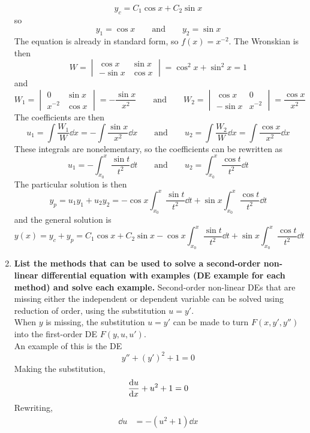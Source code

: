 \documentclass[12pt]{article}
\begin{document}
\begin{enumerate}
				\[y_c = C_1\cos x + C_2\sin x\]
				so
				\[
					y_1 = \cos x \qquad \text{and} \qquad
					y_2 = \sin x
				\]
				The equation is already in standard form, so \(f(x) = x^{-2}\).	The Wronskian is then
				\[
					W = \begin{vmatrix}
						\cos x & \sin x \\
						-\sin x & \cos x
					\end{vmatrix} = \cos^2x + \sin^2x = 1
				\]
				and
				\[
					W_1 = \begin{vmatrix}
						0 & \sin x \\
						x^{-2} & \cos x
					\end{vmatrix} = -\frac{\sin x}{x^2} \qquad \text{and} \qquad
					W_2 = \begin{vmatrix}
 						\cos x & 0 \\
 						-\sin x & x^{-2}
 					\end{vmatrix} = \frac{\cos x}{x^2}
				\]
				The coefficients are then
				\[
					u_1 = \int \frac{W_1}{W} \dd{x} = -\int \frac{\sin x}{x^2} \dd{x} \qquad \text{and} \qquad
					u_2 = \int \frac{W_2}{W} \dd{x} = \int \frac{\cos x}{x^2} \dd{x}
				\]
				These integrals are nonelementary, so the coefficients can be rewritten as
				\[
					u_1 = -\int_{x_0}^x \frac{\sin t}{t^2} \dd{t} \qquad \text{and} \qquad
					u_2 = \int_{x_0}^x \frac{\cos t}{t^2}\dd{t}
				\]
				The particular solution is then
				\[
					y_p = u_1y_1 + u_2y_2
						= -\cos x\int_{x_0}^x \frac{\sin t}{t^2}\dd{t} + \sin x\int_{x_0}^x \frac{\cos t}{t^2}\dd{t}
				\]
				and the general solution is
				\[
					y(x) = y_c + y_p 
						= C_1\cos x + C_2\sin x -\cos x\int_{x_0}^x \frac{\sin t}{t^2}\dd{t} + \sin x\int_{x_0}^x \frac{\cos t}{t^2}\dd{t}
				\]
		\item \textbf{List the methods that can be used to solve a second-order non-linear differential equation with examples (DE example for each method) and solve each example.}
			Second-order non-linear DEs that are missing either the independent or dependent variable can be solved using reduction of order, using the substitution \(u = y'\). \\
			When \(y\) is missing, the substitution \(u = y'\) can be made to turn \(F(x, y', y'')\) into the first-order DE \(F(y, u, u')\). \\
			An example of this is the DE
				\[y'' + (y')^2 + 1 = 0\]
				Making the substitution,
				\[\dv{u}{x} + u^2 + 1 = 0\]
				Rewriting,
				\begin{align*}
					\dd{u} &= -\left(u^2 + 1\right)\dd{x} \\

\end{align*}
\end{enumerate}
\end{document}
